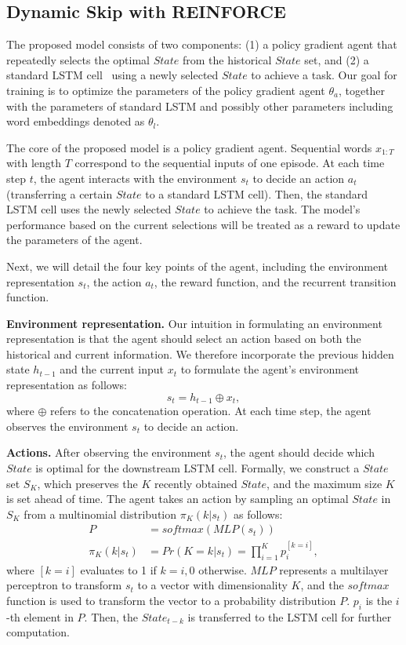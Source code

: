 \documentclass[letterpaper]{article} \usepackage{aaai19}  \usepackage{times}  \usepackage{helvet}  \usepackage{courier}  \usepackage{url}  \usepackage{graphicx}  \usepackage{amsmath}
\begin{document}
\subsection{Dynamic Skip with REINFORCE}
The proposed model consists of two components: (1) a policy gradient agent that repeatedly selects the optimal $State$ from the historical $State$ set, and (2) a standard LSTM cell~\cite{hochreiter1997long} using a newly selected $State$ to achieve a task. Our goal for training is to optimize the parameters of the policy gradient agent $\theta_a$, together with the parameters of standard LSTM and possibly other parameters including word embeddings denoted as $\theta_l$. 

The core of the proposed model is a policy gradient agent. Sequential words $x_{1:T}$ with length $T$ correspond to the sequential inputs of one episode. At each time step $t$, the agent interacts with the environment $s_t$ to decide an action $a_t$ (transferring a certain $State$ to a standard LSTM cell). Then, the standard LSTM cell uses the newly selected $State$ to achieve the task. The model's performance based on the current selections will be treated as a reward to update the parameters of the agent. 

Next, we will detail the four key points of the agent, including the environment representation $s_t$, the action $a_t$, the reward function, and the recurrent transition function.

\noindent \textbf{Environment representation.} Our intuition in formulating an environment representation is that the agent should select an action based on both the historical and current information. We therefore incorporate the previous hidden state $h_{t-1}$ and the current input $x_t$ to formulate the agent's environment representation as follows: $$s_t = h_{t-1} \oplus x_t,$$
where $\oplus$ refers to the concatenation operation. At each time step, the agent observes the environment $s_t$ to decide an action.

\noindent \textbf{Actions.} After observing the environment $s_t$, the agent should decide which $State$ is optimal for the downstream LSTM cell. Formally, we construct a $State$ set $S_K$, which preserves the $K$ recently obtained $State$, and the maximum size $K$ is set ahead of time. The agent takes an action by sampling an optimal $State$ in $S_K$ from a multinomial distribution $\pi_K(k|s_t)$ as follows:
\begin{equation}
\begin{aligned}
P &= softmax(MLP(s_t)) \\
\pi_K(k|s_t) &= Pr(K=k|s_t) = \prod_{i=1}^Kp_i^{[k=i]},
\end{aligned}
\end{equation} 
where $[k=i]$ evaluates to 1 if $k=i, 0$ otherwise. $MLP$ represents a multilayer perceptron to transform $s_t$ to a vector with dimensionality $K$, and the $softmax$ function is used to transform the vector to a probability distribution $P$. $p_i$ is the $i$-th element in $P$. Then, the $State_{t-k}$ is transferred to the LSTM cell for further computation.
\end{document}
